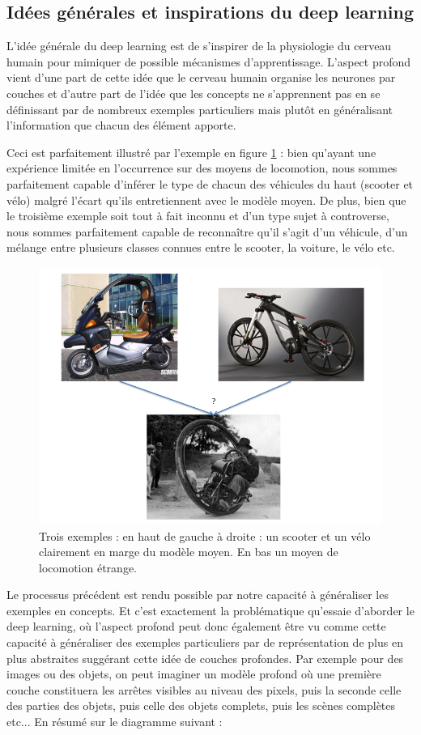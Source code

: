 \documentclass[conference]{IEEEtran}
\begin{document}
\subsection{Idées générales et inspirations du deep learning}
L'idée générale du deep learning est de s'inspirer de la physiologie du cerveau humain pour mimiquer de possible mécanismes d'apprentissage. L'aspect profond vient d'une part de cette idée que le cerveau humain organise les neurones par couches et d'autre part de l'idée que les concepts ne s'apprennent pas en se définissant par de nombreux exemples particuliers mais plutôt en généralisant l'information que chacun des élément apporte.

Ceci est parfaitement illustré par l'exemple en figure \ref{3ex} : bien qu'ayant une expérience limitée en l'occurrence sur des moyens de locomotion, nous sommes parfaitement capable d'inférer le type de chacun des véhicules du haut (scooter et vélo) malgré l'écart qu'ils entretiennent avec le modèle moyen. De plus, bien que le troisième exemple soit tout à fait inconnu et d'un type sujet à controverse, nous sommes parfaitement capable de reconnaître qu'il s'agit d'un véhicule, d'un mélange entre plusieurs classes connues entre le scooter, la voiture, le vélo etc.
\begin{figure}[H]
\includegraphics[width=\columnwidth]{fig/Diapositive1.png}
\caption{Trois exemples : en haut de gauche à droite : un scooter et un vélo clairement en marge du modèle moyen. En bas un moyen de locomotion étrange.}
\label{3ex}
\end{figure}

Le processus précédent est rendu possible par notre capacité à généraliser les exemples en concepts. Et c'est exactement la problématique qu'essaie d'aborder le deep learning, où l'aspect profond peut donc également être vu comme cette capacité à généraliser des exemples particuliers par de représentation de plus en plus abstraites suggérant cette idée de couches profondes. Par exemple pour des images ou des objets, on peut imaginer un modèle profond où une première couche constituera les arrêtes visibles au niveau des pixels, puis la seconde celle des parties des objets, puis celle des objets complets, puis les scènes complètes etc... En résumé sur le diagramme suivant : 
\end{document}
